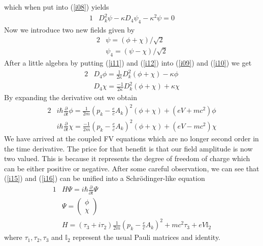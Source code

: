 \documentclass[]{article}
\numberwithin{equation}{subsection}
\begin{document}
which when put into (\ref{i08}) yields
\begin{alignat}{1}
  \label{i10} &D_{k}^{2}\psi-\kappa D_{4}\psi_{4}-\kappa^{2}\psi=0
\end{alignat}
Now we introduce two new fields given by
\begin{alignat}{2}
  \label{i11} &\psi=(\phi+\chi)/\sqrt{2}\\
  \label{i12} &\psi_{4}=(\psi-\chi)/\sqrt{2}
\end{alignat}
After a little algebra by putting (\ref{i11}) and (\ref{i12}) into (\ref{i09}) and (\ref{i10}) we get
\begin{alignat}{2}
  \label{i13} &D_{4}\phi=\frac{1}{2\kappa}D_{k}^{2}(\phi+\chi)-\kappa\phi\\
  \label{i14} &D_{4}\chi=\frac{-1}{2\kappa}D_{k}^{2}(\phi+\chi)+\kappa\chi
\end{alignat}
By expanding the derivative out we obtain
\begin{alignat}{2}
  \label{i15} &i\hbar\frac{\partial}{\partial t}\phi=\frac{1}{2m}(p_{k}-\frac{e}{c}A_{k})^{2}(\phi+\chi)+(eV+mc^{2})\phi\\
  \label{i16} &i\hbar\frac{\partial}{\partial t}\chi=\frac{-1}{2m}(p_{k}-\frac{e}{c}A_{k})^{2}(\phi+\chi)+(eV-mc^{2})\chi
\end{alignat}
We have arrived at the coupled FV equations which are no longer second order in the time derivative. The price for that benefit is that our field amplitude is now two valued. This is because it represents the degree of freedom of charge which can be either positive or negative. After some careful observation, we can see that (\ref{i15}) and (\ref{i16}) can be unified into a Schr{\"o}dinger-like equation
\begin{alignat}{1}
  \label{i17} &H\Psi=i\hbar\frac{\partial}{\partial t}\Psi\\
  \label{i18} &\Psi=
  \begin{pmatrix}
    \phi\\
    \chi
  \end{pmatrix}\\
  \label{i19} &H=(\tau_{3}+i\tau_{2})\frac{1}{2m}(p_{k}-\frac{e}{c}A_{k})^{2}+mc^{2}\tau_{3}+eV\mathbb{I}_{2}
\end{alignat}
where $\tau_{1}, \tau_{2}, \tau_{3}$ and $\mathbb{I}_{2}$ represent the usual Pauli matrices and identity.\\
\end{document}
